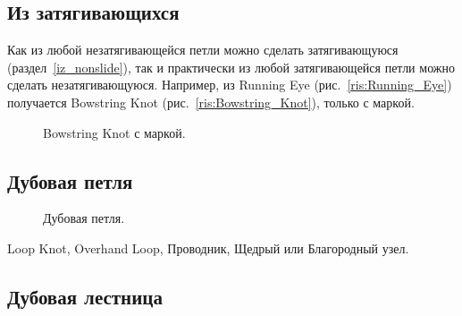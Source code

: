 \subsection{Из затягивающихся}\label{iz_slide}

Как из любой незатягивающейся петли можно сделать затягивающуюся (раздел~\ref{iz_nonslide}), так и практически из любой затягивающейся петли можно сделать незатягивающуюся. Например, из Running Eye (рис.~\ref{ris:Running_Eye}) получается Bowstring Knot (рис.~\ref{ris:Bowstring_Knot}), только с маркой.

\begin{figure}[H]\centering
	\subfloat[Завязывание]{\label{ris:Bowstring_Knot_marka_1}
	\tcbox[enhanced jigsaw,colframe=black,opacityframe=0.5,opacityback=0.5]
		{\centering
			}
		}
\end{figure}

\begin{figure}[H]\centering
	\subfloat[Результат]{\label{ris:Bowstring_Knot_marka_2}
	\tcbox[enhanced jigsaw,colframe=black,opacityframe=0.5,opacityback=0.5]
		{\centering
			}
		}
	\caption{Bowstring Knot с маркой.}\label{ris:Bowstring_Knot_marka}
\end{figure}

\subsection{Дубовая петля}

\begin{figure}[H]\centering
	\subfloat[Завязывание]{\label{ris:Dubovaya_loop_1}
	\tcbox[enhanced jigsaw,colframe=black,opacityframe=0.5,opacityback=0.5]
		{\centering
			}
		}
\end{figure}

\begin{figure}[H]\centering
	\subfloat[Результат]{\label{ris:Dubovaya_loop_2}
	\tcbox[enhanced jigsaw,colframe=black,opacityframe=0.5,opacityback=0.5]
		{\centering
			}
		}
	\caption{Дубовая петля.}\label{ris:Dubovaya_loop}
\end{figure}

Loop Knot, Overhand Loop, Проводник, Щедрый или Благородный узел.

\subsection{Дубовая лестница}

